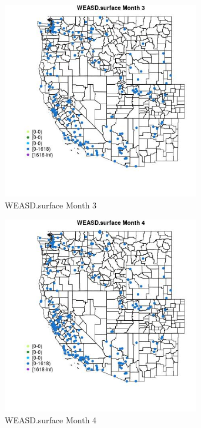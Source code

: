 \begin{figure} 
\centering  
\includegraphics[width=0.77\textwidth]{Code_Outputs/Report_ML_input_PM25_Step4_part_e_de_duplicated_aveswNAs_MapObsMo3WEASDsurface.jpg} 
\caption{\label{fig:Report_ML_input_PM25_Step4_part_e_de_duplicated_aveswNAsMapObsMo3WEASDsurface}WEASD.surface Month 3} 
\end{figure} 
 

\clearpage 

\begin{figure} 
\centering  
\includegraphics[width=0.77\textwidth]{Code_Outputs/Report_ML_input_PM25_Step4_part_e_de_duplicated_aveswNAs_MapObsMo4WEASDsurface.jpg} 
\caption{\label{fig:Report_ML_input_PM25_Step4_part_e_de_duplicated_aveswNAsMapObsMo4WEASDsurface}WEASD.surface Month 4} 
\end{figure} 
 

